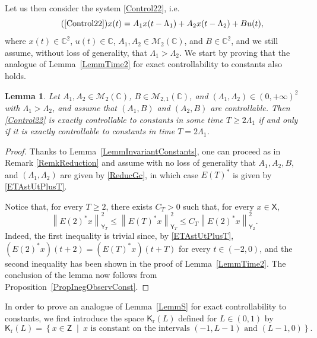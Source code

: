 \documentclass[10pt]{amsart}
\theoremstyle{plain}
\newtheorem{lemm}[theo]{Lemma}
\theoremstyle{definition}
\newcommand{\midsuchthat}{\;\middle|\:}
\newcommand{\norm}[1]{\left\lVert #1\right\lVert}
\providecommand{\ie}{i.e.}\providecommand{\etc}{etc.}\providecommand{\resp}{resp.}\providecommand{\cf}{cf.}
\begin{document}
Let us then consider the system \eqref{Control22}, \ie 
\begin{equation*}
\tag{\ref{Control22}}
x(t) = A_1 x(t - \Lambda_1) + A_2 x(t - \Lambda_2) + B u(t),
\end{equation*}
where $x(t) \in \mathbb C^2$, $u(t) \in \mathbb C$, $A_1, A_2 \in \mathcal M_2(\mathbb C)$, and $B \in \mathbb C^2$, and we still assume, without loss of generality, that $\Lambda_1 > \Lambda_2$. We start by proving that the analogue of Lemma~\ref{LemmTime2} for exact controllability to constants also holds.

\begin{lemm}
\label{LemmContConstTIff2}
Let $A_1, A_2 \in \mathcal M_2(\mathbb C)$, $B \in \mathcal M_{2, 1}(\mathbb C)$, and $(\Lambda_1, \Lambda_2) \in (0, +\infty)^2$ with $\Lambda_1 > \Lambda_2$, and assume that $(A_1, B)$ and $(A_2, B)$ are controllable. Then \eqref{Control22} is exactly controllable to constants in some time $T \geq 2 \Lambda_1$ if and only if it is exactly controllable to constants in time $T = 2 \Lambda_1$.
\end{lemm}

\begin{proof}
Thanks to Lemma~\ref{LemmInvariantConstants}, one can proceed as in Remark \ref{RemkReduction} and assume with no loss of generality that $A_1, A_2, B$, and $(\Lambda_1, \Lambda_2)$ are given by \eqref{ReducGc}, in which case $E(T)^\ast$ is given by \eqref{ETAstUtPlusT}.

Notice that, for every $T \geq 2$, there exists $C_T > 0$ such that, for every $x \in \mathsf X$,
\begin{equation}
\label{EquivE2ET}
\norm{E(2)^\ast x}_{\mathsf Y_T}^2 \leq \norm{E(T)^\ast x}_{\mathsf Y_T}^2 \leq C_T \norm{E(2)^\ast x}_{\mathsf Y_2}^2.
\end{equation}
Indeed, the first inequality is trivial since, by \eqref{ETAstUtPlusT}, $(E(2)^\ast x)(t + 2) = (E(T)^\ast x)(t + T)$ for every $t \in (-2, 0)$, and the second inequality has been shown in the proof of Lemma~\ref{LemmTime2}. The conclusion of the lemma now follows from Proposition~\ref{PropInegObservConst}.
\end{proof}

In order to prove an analogue of Lemma~\ref{LemmS} for exact controllability to constants, we first introduce the space $\mathsf K_{\mathrm r}(L)$ defined for $L \in (0, 1)$ by
\[
\mathsf K_{\mathrm r}(L) = \left\{x \in \mathsf Z \midsuchthat x \text{ is constant on the intervals } (-1, L-1) \text{ and } (L-1, 0)\right\}.
\]
\end{document}
